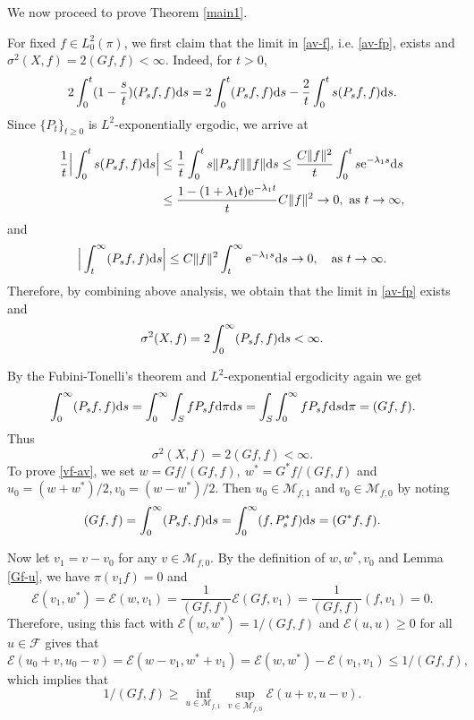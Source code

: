 \documentclass[12pt,reqno]{article}
\theoremstyle{definition}
\theoremstyle{remark}
\theoremstyle{example}
\numberwithin{equation}{section}
\newcommand{\scr}[1]{\mathscr #1}
\def\d{\mathrm{d}}
\def\e{\scr E}
\def\d{\rm d}
\def\bg{\begin}
\def\be{\bg{equation}}
\def\de{\end{equation}}
\def\lb{\label}
\def\d{{\mbox{\rm d}}}
\begin{document}
{We now proceed to prove Theorem \ref{main1}.

\medskip
{}
For fixed $f\in L^2_0(\pi)$, we first claim that the limit in \eqref{av-f}, i.e. \eqref{av-fp}, exists and $\sigma^2(X,f)=2(Gf,f)<\infty$. Indeed, for $t>0$,
$$
2\int_0^t (1-\frac{s}{t})( P_s f,f)\d s=2\int_0^t( P_sf,f)\d s-\frac{2}{t}\int_0^ts( P_sf,f)\d s.
$$
Since $\{P_t\}_{t\geq 0}$ is $L^2$-exponentially ergodic, we arrive at

	$$
		\aligned
			\frac{1}{t}\Big|\int_0^ts( P_sf,f)\d s\Big|&\leq \frac{1}{t} \int_0^t s\|P_s f\|\|f\|\d s\leq \frac{C\|f\|^2}{t} \int_0^t s\mathrm{e}^{-\lambda_1 s}\d s\\
			&\leq\frac{1-(1+\lambda_1 t)\mathrm{e}^{-\lambda_1 t}}{t}C\|f\|^2  \rightarrow0, \ \text{as}\ t\rightarrow\infty,
		\endaligned
	$$
and
$$
\Big|\int_t^\infty ( P_sf,f)\d s\Big|\leq C\|f\|^2\int_t^\infty \text{e}^{-\lambda_1 s}\d s\rightarrow 0,\quad \text{as }t\rightarrow\infty.
$$
Therefore, by combining above analysis, we obtain that the limit in \eqref{av-fp} exists and
\begin{equation*}\label{representation}
	\sigma^2(X,f)=2\int_0^\infty( P_sf,f)\d s<\infty.
\end{equation*}

By the Fubini-Tonelli’s theorem and $L^2$-exponential ergodicity again we get
$$
\int_0^\infty(P_sf,f)\d s=\int_0^\infty\int_S fP_sf\d\pi\d s=\int_S\int_0^\infty fP_sf\d s\d\pi=( Gf,f).
$$
Thus
\begin{equation}\label{representation}
\sigma^2(X,f)=2(Gf,f)<\infty.
\end{equation}
To prove \eqref{vf-av}, we set $w=Gf/(Gf,f),\ w^*=G^*f/( Gf,f)$ and $u_0=(w+w^*)/2, v_0=(w-w^*)/2$. Then $u_0\in \scr{M}_{f,1}$ and $v_0\in \scr{M}_{f,0}$ by noting
$$(Gf,f)=\int_0^\infty(P_sf,f)\d s=\int_0^\infty(f,P^*_sf)\d s=( G^*f,f).
$$

Now  let $v_1=v-v_0$ for any $v\in\scr{M}_{f,0}$. By the definition of $w,w^*,v_0$ and Lemma \ref{Gf-u}, we have $\pi(v_1f)=0$ and
$$
\e(v_1,w^*)=\e(w,v_1)=\frac{1}{( Gf,f)}\e(Gf,v_1)=\frac{1}{( Gf,f)}( f,v_1)=0.
$$
Therefore, using this fact with $\e(w,w^*)=1/(Gf,f)$ and $\e(u,u)\geq0$ for all $u\in\scr{F}$ gives that
$$
\e(u_0+v,u_0-v)=\e(w-v_1,w^*+v_1)=\e(w,w^*)-\e(v_1,v_1)\leq 1/( Gf,f),
$$
which implies that
\be\lb{geq}
1/( Gf,f)\geq\inf_{u\in\scr{M}_{f,1}}\sup_{v\in\scr{M}_{f,0}}\e(u+v,u-v).
\de

}
\end{document}
